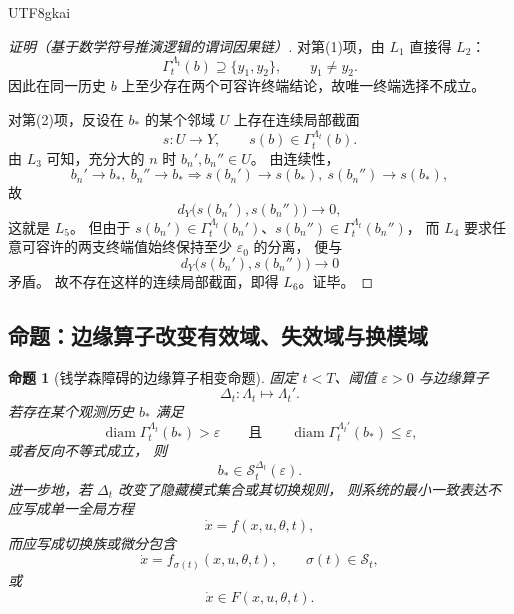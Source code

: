 \documentclass[12pt]{article}
\newtheorem{proposition}{命题}[section]
\newcommand{\diameter}{\operatorname{diam}}
\begin{document}
\begin{CJK*}{UTF8}{gkai}
\begin{proof}[证明（基于数学符号推演逻辑的谓词因果链）]
对第(1)项，由 \(L_1\) 直接得 \(L_2\)：
\[
  \Gamma_t^{\Lambda_t}(b)
  \supseteq
  \{y_1,y_2\},
  \qquad
  y_1\neq y_2.
\]
因此在同一历史 $b$ 上至少存在两个可容许终端结论，故唯一终端选择不成立。

对第(2)项，反设在 $b_\ast$ 的某个邻域 $U$ 上存在连续局部截面
\[
  s:U\to Y,
  \qquad
  s(b)\in\Gamma_t^{\Lambda_t}(b).
\]
由 \(L_3\) 可知，充分大的 $n$ 时 $b_n',b_n''\in U$。
由连续性，
\[
  b_n'\to b_\ast,\ b_n''\to b_\ast
  \Rightarrow
  s(b_n')\to s(b_\ast),\ s(b_n'')\to s(b_\ast),
\]
故
\[
  d_Y\bigl(s(b_n'),s(b_n'')\bigr)\to 0,
\]
这就是 \(L_5\)。
但由于 $s(b_n')\in \Gamma_t^{\Lambda_t}(b_n')$、$s(b_n'')\in \Gamma_t^{\Lambda_t}(b_n'')$，
而 \(L_4\) 要求任意可容许的两支终端值始终保持至少 $\varepsilon_0$ 的分离，
便与
\[
  d_Y\bigl(s(b_n'),s(b_n'')\bigr)\to 0
\]
矛盾。
故不存在这样的连续局部截面，即得 \(L_6\)。证毕。
\end{proof}

\subsection{命题：边缘算子改变有效域、失效域与换模域}
\label{subsec:tex1-ch1-proposition}

\begin{proposition}[钱学森障碍的边缘算子相变命题]
\label{prop:tex1-edge-phase}
固定 $t<T$、阈值 $\varepsilon>0$ 与边缘算子
\[
  \Delta_t:\Lambda_t\mapsto\Lambda_t'.
\]
若存在某个观测历史 $b_\ast$ 满足
\[
  \diameter\Gamma_t^{\Lambda_t}(b_\ast)>\varepsilon
  \qquad\text{且}\qquad
  \diameter\Gamma_t^{\Lambda_t'}(b_\ast)\le \varepsilon,
\]
或者反向不等式成立，
则
\[
  b_\ast\in \mathcal S_t^{\Delta_t}(\varepsilon).
\]
进一步地，若 $\Delta_t$ 改变了隐藏模式集合或其切换规则，
则系统的最小一致表达不应写成单一全局方程
\[
  \dot x=f(x,u,\theta,t),
\]
而应写成切换族或微分包含
\[
  \dot x=f_{\sigma(t)}(x,u,\theta,t),
  \qquad
  \sigma(t)\in\mathcal S_t,
\]
或
\[
  \dot x\in F(x,u,\theta,t).
\]
\end{proposition}


\end{CJK*}
\end{document}
